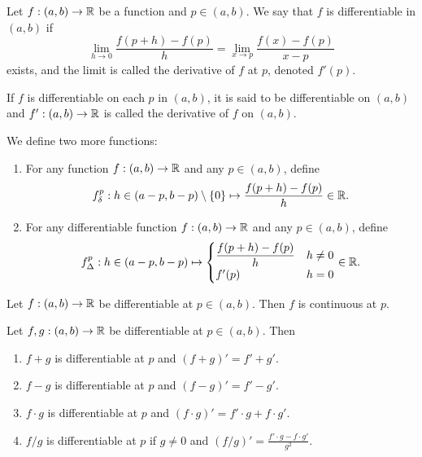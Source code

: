 \documentclass[12pt]{article}
\begin{document}
\begin{defn} \label{defn:diff}
    Let $f : (a, b) \to \mathbb{R}$ be a function and $p \in (a, b)$. We say that $f$ is differentiable in $(a, b)$ if \[
        \lim_{h \to 0} \frac{f(p + h) - f(p)}{h} = \lim_{x \to p} \frac{f(x) - f(p)}{x - p}
    \] exists, and the limit is called the derivative of $f$ at $p$, denoted $f'(p)$.

    If $f$ is differentiable on each $p$ in $(a, b)$, it is said to be differentiable on $(a, b)$ and $f' : (a, b) \to \mathbb{R}$ is called the derivative of $f$ on $(a, b)$.

    We define two more functions:
    \begin{enumerate}[label=(\alph*)]
        \item For any function $f : (a, b) \to \mathbb{R}$ and any $p \in (a, b)$, define \[
            f^{p}_{\delta} : h \in (a - p, b - p) \setminus \set{0} \mapsto \frac{f(p + h) - f(p)}{h} \in \R.
        \]
        \item For any differentiable function $f : (a, b) \to \mathbb{R}$ and any $p \in (a, b)$, define \[
            f^{p}_{\Delta} : h \in (a - p, b - p) \mapsto \begin{cases}
                \dfrac{f(p + h) - f(p)}{h} & h \neq 0 \\
                f'(p) & h = 0
            \end{cases} \in \mathbb{R}.
        \]
    \end{enumerate}
\end{defn}

\begin{thm} \label{thm:diff:continuity}
    Let $f : (a, b) \to \mathbb{R}$ be differentiable at $p \in (a, b)$. Then $f$ is continuous at $p$.
\end{thm}

\begin{thm} \label{thm:diff:laws}
    Let $f, g : (a, b) \to \mathbb{R}$ be differentiable at $p \in (a, b)$. Then
    \begin{enumerate}[label=(\alph*)]
        \item $f + g$ is differentiable at $p$ and $(f + g)' = f' + g'$.
        \item $f - g$ is differentiable at $p$ and $(f - g)' = f' - g'$.
        \item $f \cdot g$ is differentiable at $p$ and $(f \cdot g)' = f' \cdot g + f \cdot g'$.
        \item $f / g$ is differentiable at $p$ if $g \neq 0$ and $(f / g)' = \frac{f' \cdot g - f \cdot g'}{g^2}$.
    \end{enumerate}
\end{thm}
\end{document}
